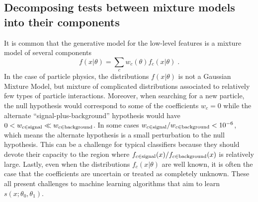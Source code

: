 \documentclass[11pt, oneside]{article}   	%
\begin{document}
\subsection{Decomposing tests between mixture models into their components}

It is common that the generative model for the low-level features is a mixture model of several components
\begin{equation}
f(x|\theta)=\sum_c w_c(\theta) f_c(x| \theta) \;.
\end{equation}
In the case of particle physics, the distributions $f(x|\theta)$ is not a Gaussian Mixture Model, but mixture of  complicated distributions associated to relatively few types of particle interactions. Moreover, when searching for a new particle, the null hypothesis would correspond to some of the coefficients $w_c=0$ while the alternate ``signal-plus-background'' hypothesis would have $0<w_{c\in \rm signal} \ll w_{c\in \rm background}$. In some cases $w_{c\in \rm signal} / w_{c\in \rm background} <10^{-6}$, which means the alternate hypothesis is a small perturbation to the null hypothesis. This can be a challenge for typical classifiers because they should devote their capacity to the region where $f_{c\in \rm signal}(x) / f_{c\in \rm background}(x)$ is relatively large. Lastly, even when the distributions $f_c(x|\theta)$ are well known, it is often the case that the coefficients are uncertain or treated as completely unknown. These all present challenges to machine learning algorithms that aim to learn $s(x; \theta_0, \theta_1)$.

%
\end{document}
